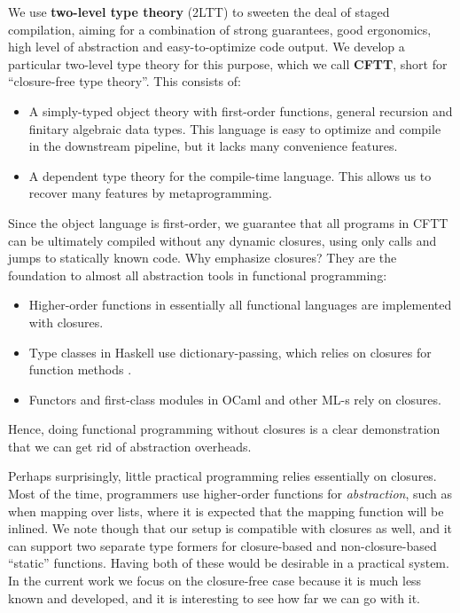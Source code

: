 \documentclass[acmsmall,screen]{acmart}
\theoremstyle{remark}
\begin{document}
We use \textbf{two-level type theory} (2LTT) \cite{twolevel,staged2ltt} to
sweeten the deal of staged compilation, aiming for a combination of strong
guarantees, good ergonomics, high level of abstraction and easy-to-optimize code
output. We develop a particular two-level type theory for this purpose, which we
call \textbf{CFTT}, short for ``closure-free type theory''. This consists of:
\begin{itemize}
\item A simply-typed object theory with first-order functions, general recursion and
      finitary algebraic data types. This language is easy to optimize and compile
      in the downstream pipeline, but it lacks many convenience features.
\item A dependent type theory for the compile-time language. This
      allows us to recover many features by metaprogramming.
\end{itemize}
Since the object language is first-order, we guarantee that all programs in CFTT
can be ultimately compiled without any dynamic closures, using only calls and
jumps to statically known code. Why emphasize closures?  They are the
foundation to almost all abstraction tools in functional programming:
\begin{itemize}
\item Higher-order functions in essentially all functional languages are implemented with closures.
\item Type classes in Haskell use dictionary-passing, which relies on closures for function methods \cite{DBLP:conf/popl/WadlerB89}.
\item Functors and first-class modules in OCaml \cite{leroy2023ocaml} and other ML-s rely on closures.
\end{itemize}
Hence, doing functional programming without closures is a clear demonstration
that we can get rid of abstraction overheads.

Perhaps surprisingly, little practical programming relies essentially on
closures. Most of the time, programmers use higher-order functions for
\emph{abstraction}, such as when mapping over lists, where it is expected that
the mapping function will be inlined. We note though that our setup is
compatible with closures as well, and it can support two separate type formers
for closure-based and non-closure-based ``static'' functions. Having both of
these would be desirable in a practical system. In the current work we focus on
the closure-free case because it is much less known and developed, and it is
interesting to see how far we can go with it.
\end{document}
